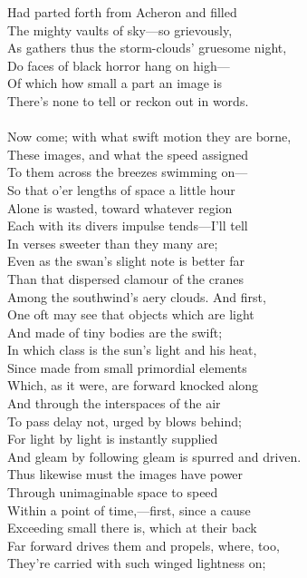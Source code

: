 Had parted forth from Acheron and filled\\
The mighty vaults of sky—so grievously,\\
As gathers thus the storm-clouds' gruesome night,\\
Do faces of black horror hang on high—\\
Of which how small a part an image is\\
There's none to tell or reckon out in words.\\
\\
Now come; with what swift motion they are borne,\\
These images, and what the speed assigned\\
To them across the breezes swimming on—\\
So that o'er lengths of space a little hour\\
Alone is wasted, toward whatever region\\
Each with its divers impulse tends—I'll tell\\
In verses sweeter than they many are;\\
Even as the swan's slight note is better far\\
Than that dispersed clamour of the cranes\\
Among the southwind's aery clouds. And first,\\
One oft may see that objects which are light\\
And made of tiny bodies are the swift;\\
In which class is the sun's light and his heat,\\
Since made from small primordial elements\\
Which, as it were, are forward knocked along\\
And through the interspaces of the air\\
To pass delay not, urged by blows behind;\\
For light by light is instantly supplied\\
And gleam by following gleam is spurred and driven.\\
Thus likewise must the images have power\\
Through unimaginable space to speed\\
Within a point of time,—first, since a cause\\
Exceeding small there is, which at their back\\
Far forward drives them and propels, where, too,\\
They're carried with such winged lightness on;\\
